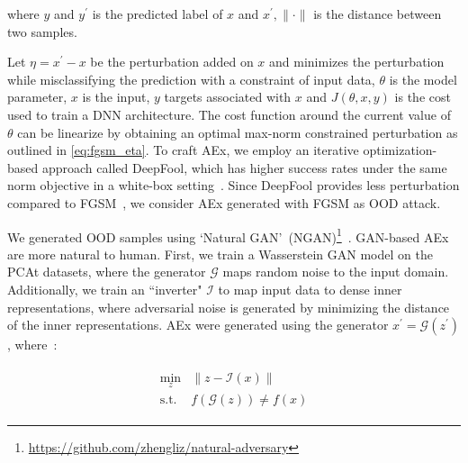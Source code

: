 where $y$ and $y^{\prime}$ is the predicted label of $x$ and $x^{\prime},\|\cdot\|$ is the distance between two samples. 

\hspace*{3.5mm}Let $\eta=x^{\prime}-x$ be the perturbation added on $x$ and minimizes the perturbation while misclassifying the prediction with a constraint of input data, ${\theta}$ is the model parameter, ${x}$ is the input, $y$ targets associated with ${x}$ and $J( \theta, x,y)$ is the cost used to train a DNN architecture. The cost function around the current value of ${\theta}$ can be linearize by obtaining an optimal max-norm constrained perturbation as outlined in \cref{eq:fgsm_eta}. To craft AEx, we employ an iterative optimization-based approach called DeepFool, which has higher success rates under the same norm objective in a white-box setting~\cite{yuan2019adversarial}. Since DeepFool provides less perturbation compared to FGSM~\cite{yuan2019adversarial}, we consider  AEx generated with FGSM as OOD attack. 

\iffalse
We generated OOD samples
using `Natural GAN'~(NGAN)\footnote{\url{https://github.com/zhengliz/natural-adversary}}~\cite{zhao2017generating}. 
GAN-based AEx are more natural to human. First, we train a Wasserstein GAN model on the PCAt datasets, where the generator $\mathcal{G}$ maps random noise to the input domain. Additionally, we train an ``inverter" $\mathcal{I}$ to map input data to dense inner representations, where adversarial noise is generated by minimizing the distance of the inner representations. AEx were generated using the generator $  x^{\prime}=\mathcal{G}\left(z^{\prime}\right)$, where~\cite{OOD19,zhao2017generating}: 

\vspace{-6mm}
\begin{align}
    \begin{array}{cl}
        \min _{z} & \|z-\mathcal{I}(x)\| \\
        \text {s.t.} & f(\mathcal{G}(z)) \neq f(x)
    \end{array}
\end{align}

